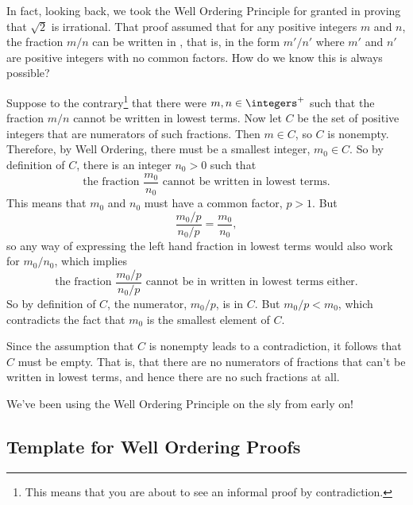In fact, looking back, we took the Well Ordering Principle for granted in
proving that $\sqrt{2}$ is irrational.  That proof assumed that for any
positive integers $m$ and $n$, the fraction $m/n$ can be written in
, that is, in the form $m'/n'$ where $m'$ and $n'$
are positive integers with no common factors.  How do we know this is
always possible?

Suppose to the contrary\footnote{This means that you are about to see
an informal proof by contradiction.} that there were
$m,n \in \integers^+$ such that the fraction $m/n$ cannot be written
in lowest terms.  Now let $C$ be the set of positive integers that are
numerators of such fractions.  Then $m \in C$, so $C$ is nonempty.
Therefore, by Well Ordering, there must be a smallest integer,
$m_0 \in C$.  So by definition of $C$, there is an integer $n_0 > 0$
such that
\[
\text{the fraction } \frac{m_0}{n_0} \text{ cannot be written in lowest
terms.}
\]
This means that $m_0$ and $n_0$ must have a common factor, $p>1$.  But
\[
\frac{m_0/p}{n_0/p} = \frac{m_0}{n_0},
\]
so any way of expressing the left hand fraction in lowest terms would also
work for $m_0/n_0$, which implies
\[
\text{the fraction } \frac{m_0/p}{n_0/p} \text{ cannot be in written in
lowest terms either.}
\]
So by definition of $C$, the numerator, $m_0/p$, is in $C$.  But $m_0/p <
m_0$, which contradicts the fact that $m_0$ is the smallest element of $C$.

Since the assumption that $C$ is nonempty leads to a contradiction, it
follows that $C$ must be empty.  That is, that there are no numerators of
fractions that can't be written in lowest terms, and hence there are no
such fractions at all.

We've been using the Well Ordering Principle on the sly from early on!

\subsection{Template for Well Ordering Proofs}

